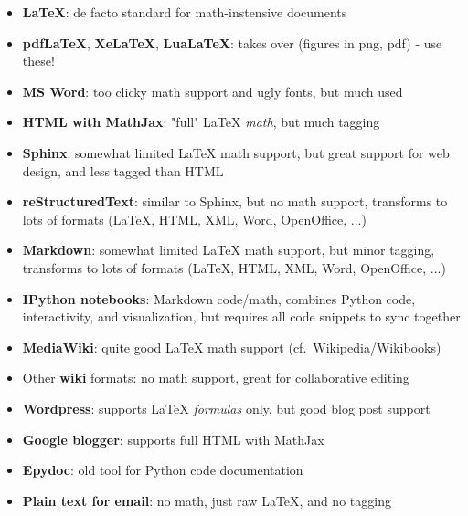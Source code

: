 \documentclass[%
twoside,                 %
final,                   %
chapterprefix=true,      %
open=right               %
10pt]{book}
\begin{document}
\begin{itemize}
 \item \textbf{LaTeX}: de facto standard for math-instensive documents

 \item \textbf{pdfLaTeX}, \textbf{XeLaTeX}, \textbf{LuaLaTeX}: takes over (figures in png, pdf) - use these!

 \item \textbf{MS Word}: too clicky math support and ugly fonts, but much used

 \item \textbf{HTML with MathJax}: "full" {\LaTeX} \emph{math}, but much tagging

 \item \textbf{Sphinx}:
   somewhat limited {\LaTeX} math support, but great support for web design,
   and less tagged than HTML

 \item \textbf{reStructuredText}: similar to Sphinx, but no math support, transforms to
   lots of formats ({\LaTeX}, HTML, XML, Word, OpenOffice, ...)

 \item \textbf{Markdown}: somewhat limited {\LaTeX} math support, but minor tagging,
   transforms to lots of formats ({\LaTeX}, HTML, XML, Word, OpenOffice, ...)

 \item \textbf{IPython notebooks}: Markdown code/math,
   combines Python code, interactivity, and
   visualization, but requires all code snippets to sync together

 \item \textbf{MediaWiki}: quite good {\LaTeX} math support (cf.~Wikipedia/Wikibooks)

 \item Other \textbf{wiki} formats: no math support, great for collaborative editing

 \item \textbf{Wordpress}: supports {\LaTeX} \emph{formulas} only, but good blog post support

 \item \textbf{Google blogger}: supports full HTML with MathJax

 \item \textbf{Epydoc}: old tool for Python code documentation

 \item \textbf{Plain text for email}: no math, just raw {\LaTeX}, and no tagging
\end{itemize}
\end{document}
